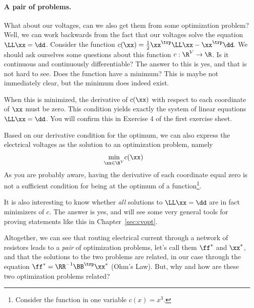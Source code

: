 \paragraph{A pair of problems.}
What about our voltages, can we also get them from some optimization
problem?
%
Well, we can work backwards from the fact that our voltages solve the
equation $\LL \xx = \dd$.
%
Consider the function $c(\xx) = \frac{1}{2} \xx^{\trp} \LL \xx -
\xx^{\trp}\dd$.
We should ask ourselves some questions about this function $c : \R^V
\to \R$. Is it continuous and continuously differentiable? The answer to this is
yes, and that is not hard to see.
Does the function have a minimum?
This is maybe not immediately clear, but the minimum does indeed exist.

When this is minimized, the derivative of $c(\xx)$ with respect to each coordinate of $\xx$
must be zero. This condition yields exactly the system of linear
equations $\LL \xx = \dd$.
You will confirm this in Exercise 4 of the first exercise sheet.

Based on our derivative condition for the optimum, we can also express the electrical voltages as the solution to
an optimization problem, namely
\begin{align*}
\min_{\xx \in \R^V} & c(\xx)
\end{align*}
As you are probably aware, having the derivative of each coordinate equal zero is not a
sufficient condition for being at the optimum of a
function\footnote{Consider the function in one variable $c(x) =
  x^3$.}.

It is also interesting to know whether \emph{all} solutions to $\LL
\xx = \dd$ are in fact minimizers of $c$. The answer is
yes, and will see some very general tools for proving statements like
this in Chapter~\ref{sec:cvopt}.

Altogether, we can see that routing electrical current through a
network of resistors leads to a \emph{pair} of optimization problems,
let's call them $\ff^*$ and $\xx^*$,
and that the solutions to the two problems are related, in our case
through the equation $\ff^* = \RR^{-1}\BB^{\trp} \xx^*$ (Ohm's Law).
But, why and how are these two optimization problems related?


